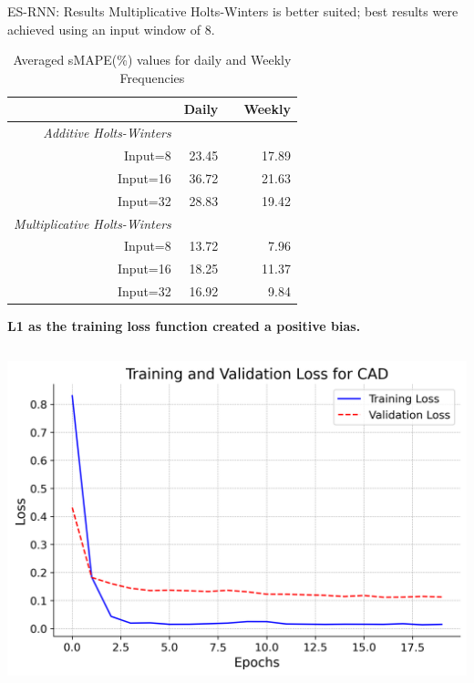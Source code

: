 \documentclass[aspectratio=169, 12pt]{beamer}
\newcommand{\ra}[1]{\renewcommand{\arraystretch}{#1}}
\begin{document}
\begin{frame}[allowframebreaks]{ES-RNN: Results}
Multiplicative Holts-Winters is better suited; best results were achieved using an input window of 8.
\begin{table}\centering
\ra{1.3}
\caption{Averaged sMAPE(\%) values for daily and Weekly Frequencies}
\begin{adjustbox}{width=0.35\textwidth}
\begin{tabular}{@{}rrcr@{}}\toprule
& Daily && Weekly\\
\midrule
\textit{Additive Holts-Winters} \\
Input=8 & 23.45 && 17.89\\
Input=16 & 36.72 && 21.63\\
Input=32 & 28.83 && 19.42\\
\textit{Multiplicative Holts-Winters} \\
Input=8 & 13.72 && 7.96\\
Input=16 & 18.25 && 11.37\\
Input=32 & 16.92 && 9.84\\
\bottomrule
\end{tabular}
\end{adjustbox}
\end{table}
\newpage
    \begin{center}
        \textbf{L1 as the training loss function created a positive bias.}
    \end{center}
\begin{columns}
    \begin{column}{0.25\textwidth}
        \includegraphics[width=\linewidth]{plots/CAD_loss_plot.png}
    \end{column}

\end{columns}
\end{frame}
\end{document}
